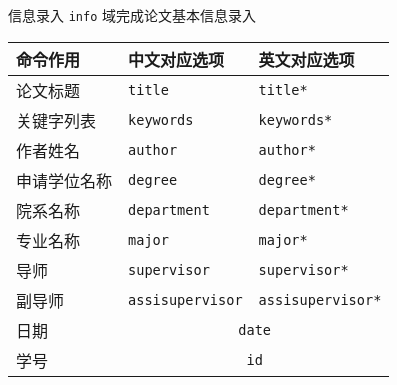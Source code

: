 \begin{frame}[fragile]{信息录入}
  \verb|info| 域完成论文基本信息录入
  \begin{table}[h]
    \centering
    \footnotesize
    \begin{tabular}{lll} \toprule
      命令作用     & 中文对应选项                      & 英文对应选项            \\ \midrule
      论文标题     & \verb|title|           & \verb|title*|
      \\
      关键字列表   & \verb|keywords|           & \verb|keywords*| \\
      作者姓名     & \verb|author|           & \verb|author*| \\
      申请学位名称 & \verb|degree|           & \verb|degree*| \\
      院系名称     & \verb|department|           & \verb|department*| \\
      专业名称     & \verb|major|           & \verb|major*| \\
      导师         & \verb|supervisor|           & \verb|supervisor*|
      \\
      副导师       & \verb|assisupervisor|           & \verb|assisupervisor*|
      \\
      日期         & \multicolumn{2}{c}{\texttt{date}}
      \\
      学号         & \multicolumn{2}{c}{\texttt{id}}
      \\
      \bottomrule
    \end{tabular}
  \end{table}
\end{frame}

